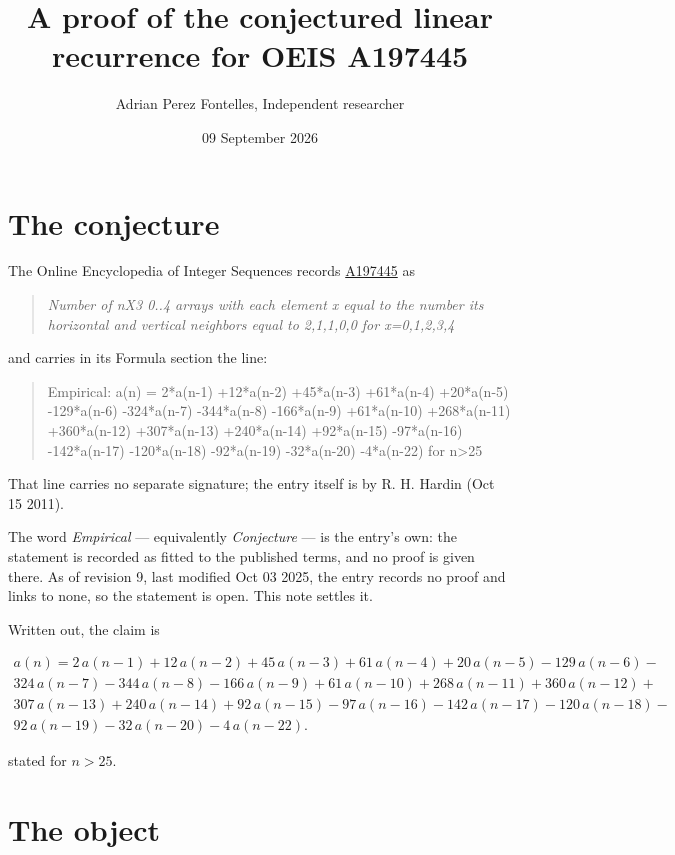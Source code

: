 \documentclass[11pt]{article}
\title{A proof of the conjectured linear recurrence for OEIS A197445}
\author{Adrian Perez Fontelles, Independent researcher}
\date{09 September 2026}
\theoremstyle{definition}
\begin{document}
\maketitle
\section{The conjecture}

The Online Encyclopedia of Integer Sequences records \href{https://oeis.org/A197445}{A197445} as

\begin{quote}\itshape Number of nX3 0..4 arrays with each element x equal to the number its horizontal and vertical neighbors equal to 2,1,1,0,0 for x=0,1,2,3,4\end{quote}

and carries in its Formula section the line:

\begin{quote}\ttfamily Empirical: a(n) = 2*a(n-1) +12*a(n-2) +45*a(n-3) +61*a(n-4) +20*a(n-5) -129*a(n-6) -324*a(n-7) -344*a(n-8) -166*a(n-9) +61*a(n-10) +268*a(n-11) +360*a(n-12) +307*a(n-13) +240*a(n-14) +92*a(n-15) -97*a(n-16) -142*a(n-17) -120*a(n-18) -92*a(n-19) -32*a(n-20) -4*a(n-22) for n>25\end{quote}

That line carries no separate signature; the entry itself is by R. H. Hardin (Oct 15 2011).

The word {\itshape Empirical} --- equivalently {\itshape Conjecture} --- is the entry's own: the statement is recorded as fitted to the published terms, and no proof is given there. As of revision 9, last modified Oct 03 2025, the entry records no proof and links to none, so the statement is open. This note settles it.

Written out, the claim is

\begin{multline*} a(n) = 2\,a(n-1) + 12\,a(n-2) + 45\,a(n-3) + 61\,a(n-4) + 20\,a(n-5) - 129\,a(n-6) - \\ 324\,a(n-7) - 344\,a(n-8) - 166\,a(n-9) + 61\,a(n-10) + 268\,a(n-11) + 360\,a(n-12) + \\ 307\,a(n-13) + 240\,a(n-14) + 92\,a(n-15) - 97\,a(n-16) - 142\,a(n-17) - 120\,a(n-18) - \\ 92\,a(n-19) - 32\,a(n-20) - 4\,a(n-22). \end{multline*}

stated for $n > 25$.

\section{The object}
\end{document}
